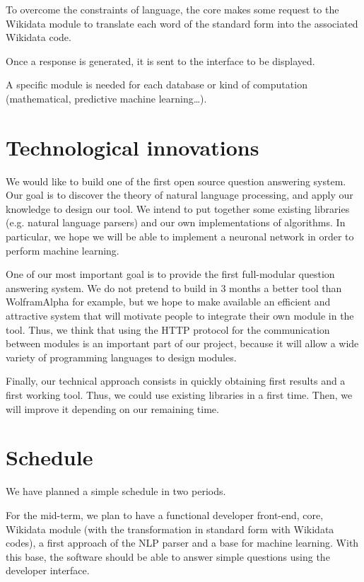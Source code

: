 \documentclass[a4paper,10pt]{article}
\begin{document}
To overcome the constraints of language, the core makes some request to the Wikidata module to translate each word of the standard form into the associated Wikidata code.

Once a response is generated, it is sent to the interface to be displayed.

A specific module is needed for each database or kind of computation (mathematical, predictive machine learning\ldots).

\section{Technological innovations}

We would like to build one of the first open source question answering system. Our goal is to discover the theory of natural language processing, and apply our knowledge to design our tool. We intend to put together some existing libraries (e.g. natural language parsers) and our own implementations of algorithms. In particular, we hope we will be able to implement a neuronal network in order to perform machine learning.

One of our most important goal is to provide the first full-modular question answering system. We do not pretend to build in 3 months a better tool than WolframAlpha for example, but we hope to make available an efficient and attractive system that will motivate people to integrate their own module in the tool. Thus, we think that using the HTTP protocol for the communication between modules is an important part of our project, because it will allow a wide variety of programming languages to design modules.

Finally, our technical approach consists in quickly obtaining first results and a first working tool. Thus, we could use existing libraries in a first time. Then, we will improve it depending on our remaining time.

\section{Schedule}

We have planned a simple schedule in two periods.

For the mid-term, we plan to have a functional developer front-end, core, Wikidata module (with the transformation in standard form with Wikidata codes), a first approach of the NLP parser and a base for machine learning. With this base, the software should be able to answer simple questions using the developer interface.
\end{document}
